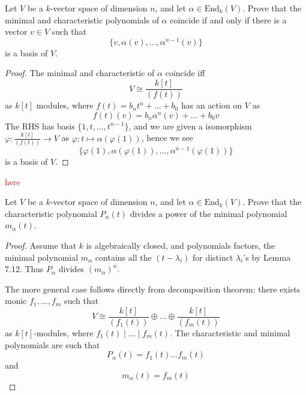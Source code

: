 \documentclass[openany]{book}
\begin{document}
\begin{prob}[7.7]
    Let \( V \) be a \( k \)-vector space of dimension \( n \), and let \( \alpha \in \text{End}_k(V) \). Prove that the minimal and characteristic polynomials of \( \alpha \) coincide if and only if there is a vector \( v \in V \) such that  
    \[ \{v, \alpha(v), \dots, \alpha^{n-1}(v)\} \] 
is a basis of \( V \).
\end{prob}
\begin{proof}
    The minimal and characteristic of $\alpha$ coincide iff 
    \begin{equation*}
        V\cong\frac{k[t]}{(f(t))}
    \end{equation*}
    as $k[t]$ modules, where $f(t)=b_nt^n+\dots+b_0$ has an action on $V$ as
    \begin{equation*}
        f(t)(v)=b_n\alpha^n(v)+\dots+b_0v
    \end{equation*} 
    The RHS has basis $\{1,t,\dots, t^{n-1}\}$,  and we are given a isomorphism $\varphi: \frac{k[t]}{(f(t))}\to V$ as  $\varphi: t\mapsto\alpha(\varphi(1))$, hence we see 
    \begin{equation*}
        \{\varphi(1),\alpha(\varphi(1)),\dots, \alpha^{n-1}(\varphi(1))\}
    \end{equation*}
    is a basis of $V$. 
\end{proof}

\textcolor{red}{here}



\begin{prob}[7.8]
    Let \( V \) be a \( k \)-vector space of dimension \( n \), and let \( \alpha \in \text{End}_k(V) \). Prove that the characteristic polynomial \( P_\alpha(t) \) divides a power of the minimal polynomial \( m_\alpha(t) \).
\end{prob}
\begin{proof}
    Assume that $k$ is algebraically closed, and polynomials factors, the minimal polynomial $m_\alpha$ contains all the $(t-\lambda_i)$ for distinct $\lambda_i$'s by Lemma 7.12. Thus $P_\alpha$ divides $(m_\alpha)^n$.

    The more general case follows directly from decomposition theorem: there exists monic $f_1,\dots, f_m$ such that 
    \begin{equation*}
        V\cong\frac{k[t]}{(f_1(t))}\oplus\dots\oplus\frac{k[t]}{(f_m(t))}
    \end{equation*}
    as $k[t]$-modules, where $f_1(t)\mid\dots\mid f_m(t)$. The characteristic and minimal polynomials are such that 
    \begin{equation*}
        P_\alpha(t)=f_1(t)\dots f_m(t)
    \end{equation*}
    and 
    \begin{equation*}
        m_\alpha(t)=f_m(t)
    \end{equation*}
\end{proof}
\end{document}
